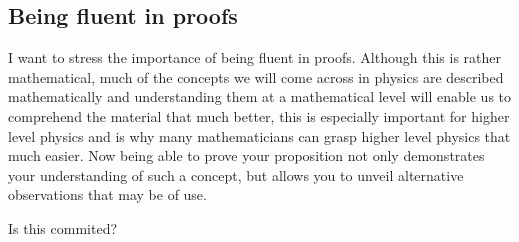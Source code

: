 \documentclass[12pt]{article}
\theoremstyle{break}
\begin{document}
\subsection{Being fluent in proofs}
I want to stress the importance of being fluent in proofs. Although this is rather mathematical, much of the concepts we will come across in physics are described mathematically and understanding them at a mathematical level will enable us to comprehend the material that much better, this is especially important for higher level physics and is why many mathematicians can grasp higher level physics that much easier. Now being able to prove your proposition not only demonstrates your understanding of such a concept, but allows you to unveil alternative observations that may be of use.

Is this commited?
\end{document}
